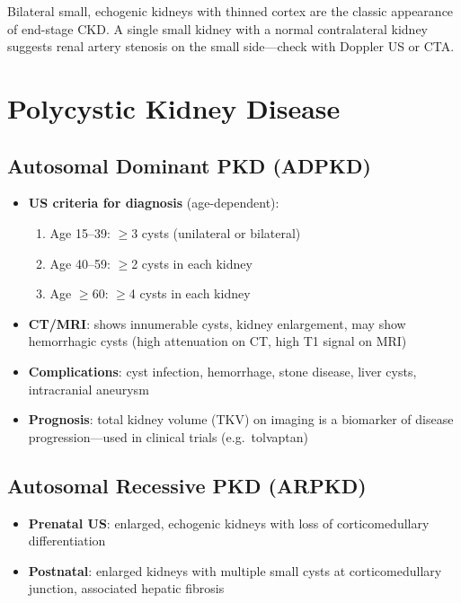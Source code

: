 \begin{pearlbox}
Bilateral small, echogenic kidneys with thinned cortex are the classic appearance of end-stage CKD. A single small kidney with a normal contralateral kidney suggests renal artery stenosis on the small side---check with Doppler US or CTA.
\end{pearlbox}

\section{Polycystic Kidney Disease}

\subsection{Autosomal Dominant PKD (ADPKD)}
\begin{itemize}
  \item \textbf{US criteria for diagnosis} (age-dependent):
    \begin{enumerate}
      \item Age 15--39: $\geq$3 cysts (unilateral or bilateral)
      \item Age 40--59: $\geq$2 cysts in each kidney
      \item Age $\geq$60: $\geq$4 cysts in each kidney
    \end{enumerate}
  \item \textbf{CT/MRI}: shows innumerable cysts, kidney enlargement, may show hemorrhagic cysts (high attenuation on CT, high T1 signal on MRI)
  \item \textbf{Complications}: cyst infection, hemorrhage, stone disease, liver cysts, intracranial aneurysm
  \item \textbf{Prognosis}: total kidney volume (TKV) on imaging is a biomarker of disease progression---used in clinical trials (e.g.\ tolvaptan)
\end{itemize}

\subsection{Autosomal Recessive PKD (ARPKD)}
\begin{itemize}
  \item \textbf{Prenatal US}: enlarged, echogenic kidneys with loss of corticomedullary differentiation
  \item \textbf{Postnatal}: enlarged kidneys with multiple small cysts at corticomedullary junction, associated hepatic fibrosis
\end{itemize}

